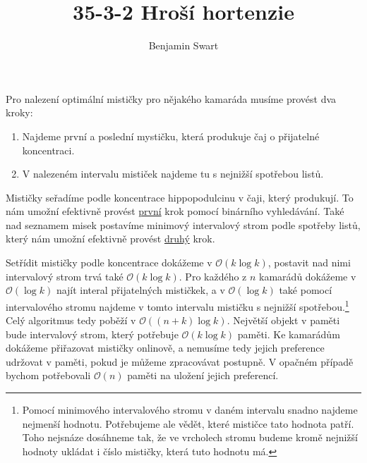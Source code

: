 \documentclass{article}
\title{35-3-2 Hroší hortenzie}
\author{Benjamin Swart}
\begin{document}
\maketitle

Pro nalezení optimální mističky pro nějakého kamaráda musíme provést dva kroky:

\begin{enumerate}
        \item \label{step-one} Najdeme první a poslední mystičku, která produkuje čaj o přijatelné koncentraci.
        \item \label{step-two} V nalezeném intervalu mističek najdeme tu s nejnižší spotřebou listů.
\end{enumerate}

Mističky seřadíme podle koncentrace hippopodulcinu v čaji, který produkují. To nám umožní efektivně provést \hyperref[step-one]{první} krok pomocí binárního vyhledávání. Také nad seznamem misek postavíme minimový intervalový strom podle spotřeby listů, který nám umožní efektivně provést \hyperref[step-two]{druhý} krok.

Setřídit mističky podle koncentrace dokážeme v $\mathcal{O}(k\log k)$, postavit nad nimi intervalový strom trvá také $\mathcal{O}(k\log k)$. Pro každého z $n$ kamarádů dokážeme v $\mathcal{O}(\log k)$ najít interal přijatelných mističkek, a v $\mathcal{O}(\log k)$ také pomocí intervalového stromu najdeme v tomto intervalu mističku s nejnižší spotřebou.\footnote{Pomocí minimového intervalového stromu v daném intervalu snadno najdeme nejmenší hodnotu. Potřebujeme ale vědět, které mističce tato hodnota patří. Toho nejsnáze dosáhneme tak, že ve vrcholech stromu budeme kromě nejnižší hodnoty ukládat i číslo mističky, která tuto hodnotu má.} Celý algoritmus tedy poběží v $\mathcal{O}((n + k) \log k)$. Největší objekt v paměti bude intervalový strom, který potřebuje $\mathcal{O}(k\log k)$ paměti. Ke kamarádům dokážeme přiřazovat mističky onlinově, a nemusíme tedy jejich preference udržovat v paměti, pokud je můžeme zpracovávat postupně. V opačném případě bychom potřebovali $\mathcal{O}(n)$ paměti na uložení jejich preferencí.
\end{document}
